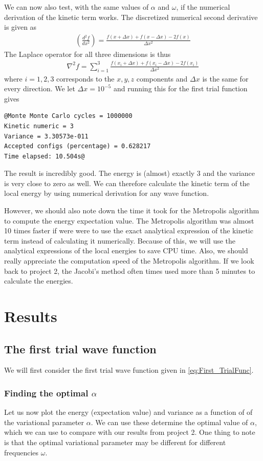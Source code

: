 \documentclass[12pt]{article}
\begin{document}
We can now also test, with the same values of $\alpha$ and $\omega$, if the numerical derivation of the kinetic term works. The discretized numerical second derivative is given as
\begin{align*}
\left(\frac{d^2f}{dx^2}\right) = \frac{f(x + \Delta x) + f(x - \Delta x) - 2f(x)}{\Delta x^2}
\end{align*}
The Laplace operator for all three dimensions is thus
\begin{align*}
\nabla^2 f = \displaystyle \sum_{i=1}^3 \frac{f(x_i + \Delta x) + f(x_i - \Delta x) - 2f(x_i)}{\Delta x^2} 
\end{align*}
where $i=1,2,3$ corresponds to the $x,y,z$ components and $\Delta x$ is the same for every direction. We let $\Delta x = 10^{-5}$ and running this for the first trial function gives
\begin{lstlisting}
@Monte Monte Carlo cycles = 1000000
Kinetic numeric = 3
Variance = 3.30573e-011
Accepted configs (percentage) = 0.628217
Time elapsed: 10.504s@
\end{lstlisting}
The result is incredibly good. The energy is (almost) exactly 3 and the variance is very close to zero as well. We can therefore calculate the kinetic term of the local energy by using numerical derivation for any wave function.

However, we should also note down the time it took for the Metropolis algorithm to compute the energy expectation value. The Metropolis algorithm was almost 10 times faster if were were to use the exact analytical expression of the kinetic term instead of calculating it numerically. Because of this, we will use the analytical expressions of the local energies to save CPU time. Also, we should really appreciate the computation speed of the Metropolis algorithm. If we look back to project 2, the Jacobi's method often times used more than  5 minutes to calculate the energies.

\section{Results}\label{section:results}
\subsection{The first trial wave function}
We will first consider the first trial wave function given in \ref{eq:First_TrialFunc}. 
\subsubsection{Finding the optimal $\alpha$}
Let us now plot the energy (expectation value) and variance as a function of of the variational parameter $\alpha$. We can use these determine the optimal value of $\alpha$, which we can use to compare with our results from project 2. One thing to note is that the optimal variational parameter may be different for different frequencies $\omega$.
\end{document}
